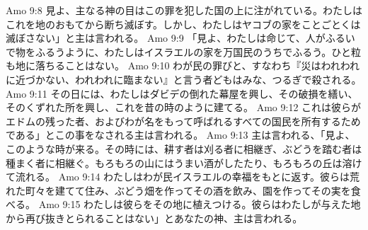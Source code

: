 Amo 9:8  見よ、主なる神の目はこの罪を犯した国の上に注がれている。わたしはこれを地のおもてから断ち滅ぼす。しかし、わたしはヤコブの家をことごとくは滅ぼさない」と主は言われる。
Amo 9:9  「見よ、わたしは命じて、人がふるいで物をふるうように、わたしはイスラエルの家を万国民のうちでふるう。ひと粒も地に落ちることはない。
Amo 9:10  わが民の罪びと、すなわち『災はわれわれに近づかない、われわれに臨まない』と言う者どもはみな、つるぎで殺される。
Amo 9:11  その日には、わたしはダビデの倒れた幕屋を興し、その破損を繕い、そのくずれた所を興し、これを昔の時のように建てる。
Amo 9:12  これは彼らがエドムの残った者、およびわが名をもって呼ばれるすべての国民を所有するためである」とこの事をなされる主は言われる。
Amo 9:13  主は言われる、「見よ、このような時が来る。その時には、耕す者は刈る者に相継ぎ、ぶどうを踏む者は種まく者に相継ぐ。もろもろの山にはうまい酒がしたたり、もろもろの丘は溶けて流れる。
Amo 9:14  わたしはわが民イスラエルの幸福をもとに返す。彼らは荒れた町々を建てて住み、ぶどう畑を作ってその酒を飲み、園を作ってその実を食べる。
Amo 9:15  わたしは彼らをその地に植えつける。彼らはわたしが与えた地から再び抜きとられることはない」とあなたの神、主は言われる。


